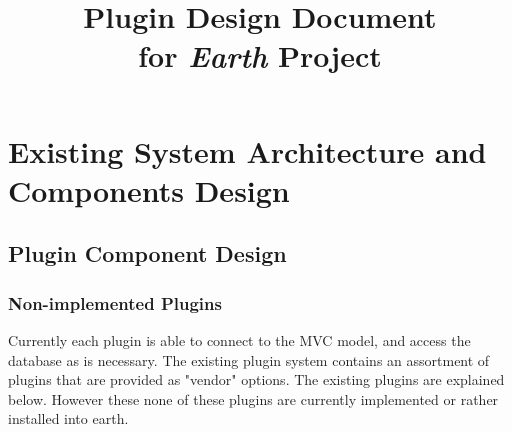 \documentclass{article}
\begin{document}
\title{\textbf{Plugin Design Document}\\ for \textit{Earth} Project}

\maketitle
\thispagestyle{empty}
\newpage{}

\thispagestyle{empty}
\tableofcontents
\newpage{}

\setcounter{page}{1}

\section{Existing System Architecture and Components Design}

\subsection{Plugin Component Design} 

\subsubsection{Non-implemented Plugins}

Currently each plugin is able to connect to the MVC model, and access the database as is necessary.
The existing plugin system contains an assortment of plugins that are provided as "vendor" options.	The existing plugins are explained below.
However these none of these plugins are currently implemented or rather installed into earth.
\end{document}
